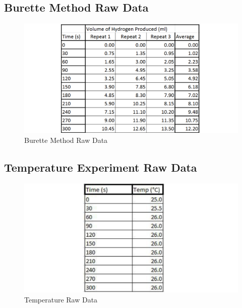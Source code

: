 \subsection{Burette Method Raw Data}\begin{figure}[H]
    \includegraphics[width=\textwidth]{./preliminarywork/images/BuretteRawData.pdf}
    \caption{Burette Method Raw Data} \label{fig:BuretteRawData}
\end{figure}

\subsection{Temperature Experiment Raw Data}\begin{figure}[H]
    \includegraphics[width=\textwidth]{./preliminarywork/images/TemperatureRawData.pdf}
    \caption{Temperature Raw Data} \label{fig:TemperatureRawData}
\end{figure}

	